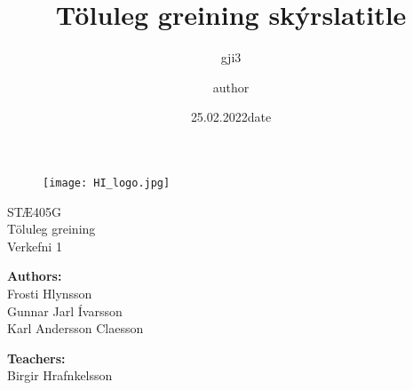 \documentclass{article}
\title{Töluleg greining skýrsla}
\author{gji3 }
\date{25.02.2022}
\begin{document}
\title{title}
\author{author}
\date{date}

\begin{titlepage}
\begin{figure}[t]
    \centering\texttt{[image: HI\_logo.jpg]}
\end{figure}
\begin{center}
    \textsc{ \LARGE{STÆ405G\\}}
	\textnormal{ \LARGE{Töluleg greining\\}}
	\vspace{30mm}
	\fontsize{10mm}{7mm}\selectfont 
    \textup{Verkefni 1}\\
\end{center}

\vspace{50mm}

\begin{minipage}[t]{0.47\textwidth}
	\textnormal{\large{\bf Authors:\\}}
	{\large Frosti Hlynsson\\ Gunnar Jarl Ívarsson \\ Karl Andersson Claesson}
\end{minipage}\hfill\begin{minipage}[t]{0.47\textwidth}\raggedleft
	\textnormal{\large{\bf Teachers:\\}}
	{\large Birgir Hrafnkelsson}
\end{minipage}

\vspace{10mm}


\end{titlepage}
\end{document}
